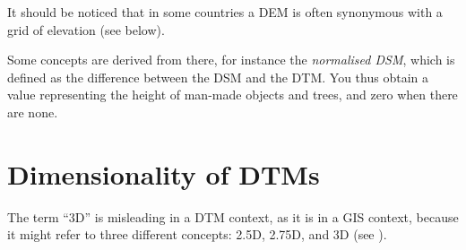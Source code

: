 It should be noticed that in some countries a DEM is often synonymous with a grid of elevation (see below).

Some concepts are derived from there, for instance the \emph{normalised DSM},%
which is defined as the difference between the DSM and the DTM\@.
You thus obtain a value representing the height of man-made objects and trees, and zero when there are none.




%
\section{Dimensionality of DTMs}

The term ``3D'' is misleading in a DTM context, as it is in a GIS context, 
because it might refer to three different concepts: 2.5D, 2.75D, and 3D (see ).
